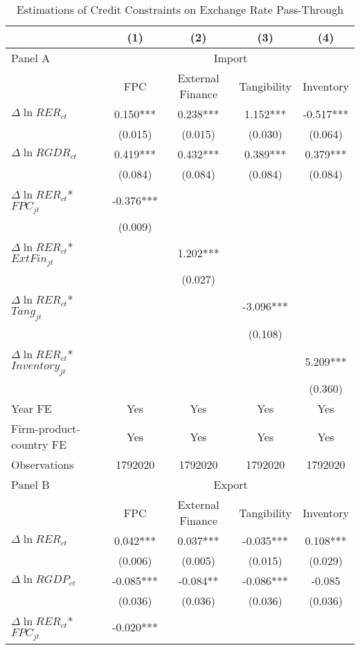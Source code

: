\begin{table}[htbp]
	\centering
	\caption{Estimations of Credit Constraints on Exchange Rate Pass-Through}
	\begin{threeparttable}	
	\begin{tabular}{lcccc}
		\toprule
		& (1)   & (2)   & (3)   & (4) \\
		\midrule
		Panel A & \multicolumn{4}{c}{Import} \\
		& FPC   & External Finance & Tangibility & Inventory \\
		\midrule
		$\Delta \ln RER_{ct}$ & 0.150*** & 0.238*** & 1.152*** & -0.517*** \\
		& (0.015) & (0.015) & (0.030) & (0.064) \\
		$\Delta \ln RGDR_{ct}$ & 0.419*** & 0.432*** & 0.389*** & 0.379*** \\
		& (0.084) & (0.084) & (0.084) & (0.084) \\
		$\Delta \ln RER_{ct}$*$FPC_{jt}$ & -0.376*** &       &       &  \\
		& (0.009) &       &       &  \\
		$\Delta \ln RER_{ct}$*$ExtFin_{jt}$ &       & 1.202*** &       &  \\
		&       & (0.027) &       &  \\
		$\Delta \ln RER_{ct}$*$Tang_{jt}$ &       &       & -3.096*** &  \\
		&       &       & (0.108) &  \\
		$\Delta \ln RER_{ct}$*$Inventory_{jt}$ &       &       &       & 5.209*** \\
		&       &       &       & (0.360) \\
		Year FE  & Yes   & Yes   & Yes   & Yes \\
		Firm-product-country FE & Yes   & Yes   & Yes   & Yes \\
		Observations & 1792020 & 1792020 & 1792020 & 1792020 \\
		\midrule
		Panel B & \multicolumn{4}{c}{Export} \\
		& FPC   & External Finance & Tangibility & Inventory \\
		\midrule
		$\Delta \ln RER_{ct}$ & 0.042*** & 0.037*** & -0.035*** & 0.108*** \\
		& (0.006) & (0.005) & (0.015) & (0.029) \\
		$\Delta \ln RGDP_{ct}$ & -0.085*** & -0.084** & -0.086*** & -0.085 \\
		& (0.036) & (0.036) & (0.036) & (0.036) \\
		$\Delta \ln RER_{ct}$*$FPC_{jt}$ & -0.020*** &       &       &  \\

\end{tabular}
\end{threeparttable}
\end{table}
